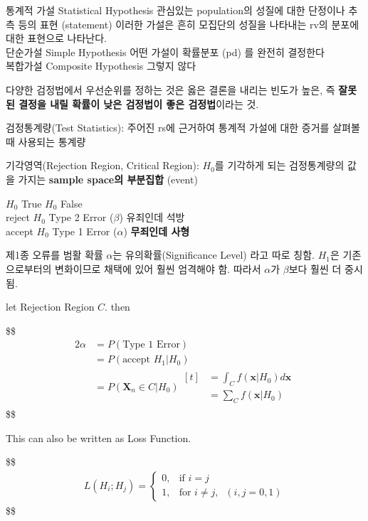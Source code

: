 \documentclass[
]{book}
\begin{document}
통계적 가설 \textbar{} Statistical Hypothesis \textbar{} 관심있는 population의 성질에 대한 단정이나 추측 등의 표현 (statement) 이러한 가설은 흔히 모집단의 성질을 나타내는 rv의 분포에 대한 표현으로 나타난다. \textbar{}\\
단순가설 \textbar{} Simple Hypothesis \textbar{} 어떤 가설이 확률분포 (pd) 를 완전히 결정한다 \textbar{}\\
복합가설 \textbar{} Composite Hypothesis \textbar{} 그렇지 않다 \textbar{}

다양한 검정법에서 우선순위를 정하는 것은 옳은 결론을 내리는 빈도가 높은, 즉 \textbf{잘못된 결정을 내릴 확률이 낮은 검정법이 좋은 검정법}이라는 것.

검정통계량(Test Statistics): 주어진 rs에 근거하여 통계적 가설에 대한 증거를 살펴볼 때 사용되는 통계량

기각영역(Rejection Region, Critical Region): \(H_0\)를 기각하게 되는 검정통계량의 값을 가지는 \textbf{sample space의 부분집합} (event)

\textbar{} \(H_0\) True \textbar{} \(H_0\) False \textbar{}\\
reject \(H_0\) \textbar{} \textbar{} Type 2 Error (\(\beta\)) 유죄인데 석방 \textbar{}\\
accept \(H_0\) \textbar{} Type 1 Error (\(\alpha\)) \textbf{무죄인데 사형} \textbar{} \textbar{}

제1종 오류를 범활 확률 \(\alpha\)는 유의확률(Significance Level) 라고 따로 칭함. \(H_1\)은 기존으로부터의 변화이므로 채택에 있어 훨씬 엄격해야 함. 따라서 \(\alpha\)가 \(\beta\)보다 훨씬 더 중시됨.

let Rejection Region \(C\). then

\$\$
\begin{alignat*}{2}

\alpha &= P(\text{Type 1 Error}) \\
&= P(\text{accept }H_1 \vert H_0) \\
&= P(\pmb X_n \in C \vert H_0) 

\begin{aligned}[t]
           & = \int_C f(\pmb x \vert H_0) d \pmb x\\
           &= \sum_C f(\pmb x \vert H_0)
         \end{aligned}


\end{alignat*}
\$\$

This can also be written as Loss Function.

\$\$
\begin{align*}

L(H_i ; H_j ) = 

 \begin{cases}
    0, & \text{if } i = j  \\
    1, & \text{for } i \not = j, \; \; (i,j = 0, 1)
    
  \end{cases}

\end{align*}
\$\$
\end{document}
